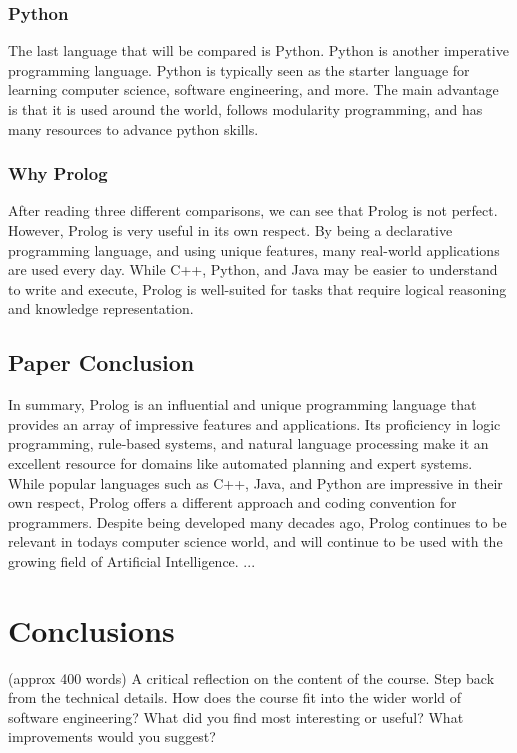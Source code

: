 \documentclass{article}
\theoremstyle{theorem}
\theoremstyle{definition}
\theoremstyle{remark}
\begin{document}
\subsubsection{Python}
The last language that will be compared is Python. Python is another imperative programming language. Python is typically seen as the starter language for learning computer science, software engineering, and more. The main advantage is that it is used around the world, follows modularity programming, and has many resources to advance python skills.

\subsubsection{Why Prolog}
\noindent\newline After reading three different comparisons, we can see that Prolog is not perfect. However, Prolog is very useful in its own respect. By being a declarative programming language, and using unique features, many real-world applications are used every day. While C++, Python, and Java may be easier to understand to write and execute, Prolog is well-suited for tasks that require logical reasoning and knowledge representation.



\subsection{Paper Conclusion}
In summary, Prolog is an influential and unique programming language that provides an array of impressive features and applications. Its proficiency in logic programming, rule-based systems, and natural language processing make it an excellent resource for domains like automated planning and expert systems. While popular languages such as C++, Java, and Python are impressive in their own respect, Prolog offers a different approach and coding convention for programmers. Despite being developed many decades ago, Prolog continues to be relevant in todays computer science world, and will continue to be used with the growing field of Artificial Intelligence.
...

\section{Conclusions}\label{conclusions}

(approx 400 words) A critical reflection on the content of the course. Step back from the technical details. How does the course fit into the wider world of software engineering? What did you find most interesting or useful? What improvements would you suggest?
\end{document}
